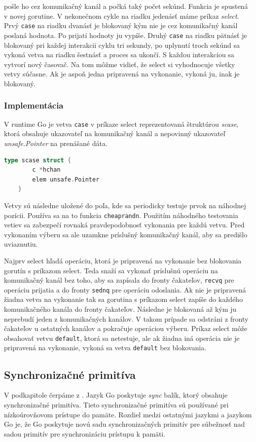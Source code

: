 \documentclass[
  biblatex,
  seconds=true,
  language=slovak,
  figures=false,
  urldate=iso,
  glossaries,
  index
]{kidiplom}
\begin{document}
pošle ho cez komunikačný kanál a počká
taký počet sekúnd. Funkcia je spustená v novej gorutine. V nekonečnom cykle na riadku jedenásť máme príkaz \emph{select}. Prvý \texttt{case} na riadku dvanásť je blokovaný kým nie je cez komunikačný kanál poslaná hodnota. Po prijatí hodnoty ju vypíše. Druhý \texttt{case} na riadku pätnásť je blokovaný pri každej interakcii cyklu tri sekundy, po uplynutí troch sekúnd sa vykoná vetva na riadku šestnásť a proces sa ukončí. S každou interakciou sa vytvorí nový časovač.
Na tom môžme vidieť, že select si vyhodnocuje
všetky vetvy súčasne. Ak je aspoň jedna pripravená na vykonanie, vykoná ju, inak je blokovaný.

\subsubsection{Implementácia}
V runtime Go je vetva \texttt{case} v príkaze select reprezentovaná štruktúrou \emph{scase}, ktorá obsahuje
ukazovateľ na komunikačný kanál a nepovinný ukazovateľ \emph{unsafe.Pointer} na prenášané dáta.\cite{select}
\newpage
\begin{lstlisting}[language=Go]
	type scase struct {
		c *hchan
		elem unsafe.Pointer
	}
\end{lstlisting}
Vetvy sú následne uložené do poľa, kde sa periodicky testuje prvok na náhodnej pozícii. Používa sa na to funkcia \texttt{cheaprandn}.
Použitím náhodného testovania vetiev sa zabezpečí rovnaká pravdepodobnosť vykonania pre každú vetvu.
Pred vykonaním výberu sa ale uzamkne príslušný komunikačný kanál, aby sa predišlo uviaznutiu.

Najprv select hľadá operáciu, ktorá je pripravená na vykonanie bez blokovania gorutín s príkazom select. Teda snaží sa vykonať
príslušnú operáciu na komunikačný kanál bez toho, aby sa zapísala do fronty čakateľov, \texttt{recvq} pre operáciu prijatia a do fronty
\texttt{sednq} pre operáciu odoslania.
Ak nie je pripravená žiadna vetva na vykonanie
tak sa gorutina s príkazom select zapíše do každého komunikačného kanála do fronty čakateľov.
Následne je blokovaná až kým ju neprebudí jeden z komunikačných kanálov. V takom prípade
sa odstráni z fronty čakateľov u ostatných kanálov a pokračuje operáciou výberu. Príkaz select môže obsahovať vetvu \texttt{default}, ktorá sa netestuje, ale
ak žiadna iná operácia nie je pripravená na vykonanie, vykoná sa vetva \texttt{default} bez blokovania.


\subsection{Synchronizačné primitíva}
V podkapitole čerpáme z \cite{sync}.
Jazyk Go poskytuje \emph{sync} balík, ktorý obsahuje synchronizačné primitíva. Tieto synchronizačné primitíva sú používané pri nízkoúrovňovom
prístupe do pamäte. Rozdiel medzi ostatnými jazykmi a jazykom Go je, že Go poskytuje novú sadu synchronizačných primitív pre súbežnosť nad sadou primitív pre synchronizáciu prístupu k pamäti.
\end{document}
